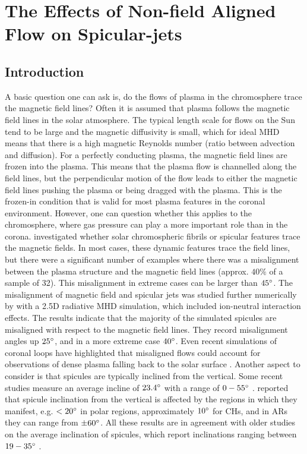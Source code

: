 \chapter{The Effects of Non-field Aligned Flow on Spicular-jets}
\label{chap:tilted_jets}
\section{Introduction}
\label{sec:c3intro}
A basic question one can ask is, do the flows of plasma in the chromosphere trace the magnetic field lines? Often it is assumed that plasma follows the magnetic field lines in the solar atmosphere. The typical length scale for flows on the Sun tend to be large and the magnetic diffusivity is small, which for ideal MHD means that there is a high magnetic Reynolds number (ratio between advection and diffusion). For a perfectly conducting plasma, the magnetic field lines are frozen into the plasma. This means that the plasma flow is channelled along the field lines, but the perpendicular motion of the flow leads to either the magnetic field lines pushing the plasma or being dragged with the plasma. This is the frozen-in condition that is valid for most plasma features in the coronal environment. However, one can question whether this applies to the chromosphere, where gas pressure can play a more important role than in the corona. \cite{delaCruzRodr2011AA527L8D} investigated whether solar chromospheric fibrils or spicular features trace the magnetic fields. In most cases, these dynamic features trace the field lines, but there were a significant number of examples where there was a misalignment between the plasma structure and the magnetic field lines (approx. $40\%$ of a sample of 32). This misalignment in extreme cases can be larger than $45^{\circ}$. The misalignment of magnetic field and spicular jets was studied further numerically by \cite{Mart2016ApJ831L1M} with a 2.5D radiative MHD simulation, which included ion-neutral interaction effects. The results indicate that the majority of the simulated spicules are misaligned with respect to the magnetic field lines. They record misalignment angles up $25^{\circ}$, and in a more extreme case $40^{\circ}$. Even recent simulations of coronal loops have highlighted that misaligned flows could account for observations of dense plasma falling back to the solar surface \citep{Petralia2018AA609A18P}. \np
%
Another aspect to consider is that spicules are typically inclined from the vertical. Some recent studies measure an average incline of $23.4^{\circ}$ with a range of $0-55^{\circ}$ \citep{Pasachoff2009SoPh26059P}. \cite{Tavabi2012JMPh31786T} reported that spicule inclination from the vertical is affected by the regions in which they manifest, e.g. $<20^{\circ}$ in polar regions, approximately $10^{\circ}$ for CHs, and in ARs they can range from $\pm 60^{\circ}$. All these results are in agreement with older studies on the average inclination of spicules, which report inclinations ranging between $19-35 ^{\circ}$ \citep{Beckers1968, Mosher1977SoPh53375M, Heristchi1992SoPh14221H, Tsiropoula2012}. \np
